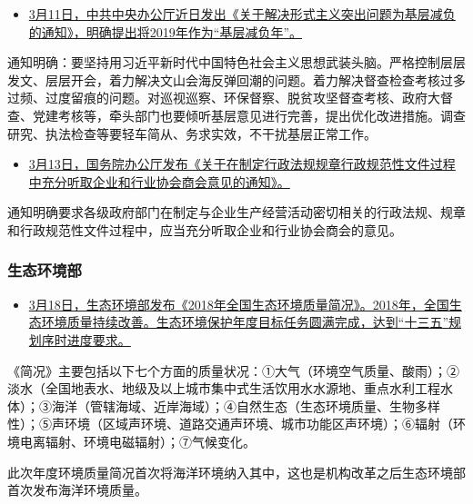 \documentclass[]{book}
\providecommand{\tightlist}{%
  \setlength{\itemsep}{0pt}\setlength{\parskip}{0pt}}
\begin{document}
\begin{itemize}
\tightlist
\item
  \href{http://www.gov.cn/zhengce/2019-03/11/content_5372964.htm}{3月11日，中共中央办公厅近日发出《关于解决形式主义突出问题为基层减负的通知》，明确提出将2019年作为``基层减负年''。}
\end{itemize}

通知明确：要坚持用习近平新时代中国特色社会主义思想武装头脑。严格控制层层发文、层层开会，着力解决文山会海反弹回潮的问题。着力解决督查检查考核过多过频、过度留痕的问题。对巡视巡察、环保督察、脱贫攻坚督查考核、政府大督查、党建考核等，牵头部门也要倾听基层意见进行完善，提出优化改进措施。调查研究、执法检查等要轻车简从、务求实效，不干扰基层正常工作。

\begin{itemize}
\tightlist
\item
  \href{http://www.gov.cn/zhengce/content/2019-03/13/content_5373423.htm}{3月13日，国务院办公厅发布《关于在制定行政法规规章行政规范性文件过程中充分听取企业和行业协会商会意见的通知》。}
\end{itemize}

通知明确要求各级政府部门在制定与企业生产经营活动密切相关的行政法规、规章和行政规范性文件过程中，应当充分听取企业和行业协会商会的意见。

\hypertarget{ux751fux6001ux73afux5883ux90e8-2}{%
\subsubsection*{生态环境部}\label{ux751fux6001ux73afux5883ux90e8-2}}

\begin{itemize}
\tightlist
\item
  \href{http://www.mee.gov.cn/xxgk2018/xxgk/xxgk15/201903/t20190318_696301.html}{3月18日，生态环境部发布《2018年全国生态环境质量简况》。2018年，全国生态环境质量持续改善。生态环境保护年度目标任务圆满完成，达到``十三五''规划序时进度要求。}
\end{itemize}

《简况》主要包括以下七个方面的质量状况：①大气（环境空气质量、酸雨）；②淡水（全国地表水、地级及以上城市集中式生活饮用水水源地、重点水利工程水体）；③海洋（管辖海域、近岸海域）；④自然生态（生态环境质量、生物多样性）；⑤声环境（区域声环境、道路交通声环境、城市功能区声环境）；⑥辐射（环境电离辐射、环境电磁辐射）；⑦气候变化。

此次年度环境质量简况首次将海洋环境纳入其中，这也是机构改革之后生态环境部首次发布海洋环境质量。
\end{document}
